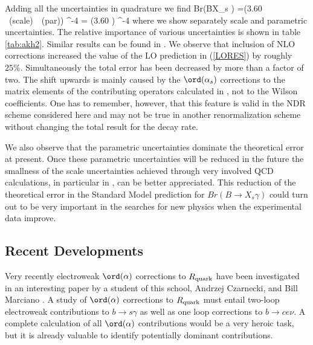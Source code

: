 Adding all the uncertainties 
in quadrature we find  
\be\label{sfin}
Br(B{\to}X_s \gamma) =(3.60 ~({\rm scale})~~({\rm par})) 
  ^{-4}
= (3.60 )  ^{-4}
\ee
where we show separately scale and parametric uncertainties.
The relative importance of various
uncertainties is shown in table \ref{tab:akh2}. Similar results
can be found in \cite{CZMM,BG98}. 
We observe that inclusion of NLO corrections
increased the value of the LO prediction in (\ref{LORES}) by 
roughly $25\%$. Simultaneously the total error has been decreased
by more than a factor of two. The shift upwards is mainly caused by the
$\ord(\alpha_s)$ corrections to the matrix elements of the
contributing operators calculated in \cite{GREUB}, 
not to the Wilson coefficients.
One has to remember, however, that this feature is valid in
the NDR scheme considered here and may not be true in another
renormalization scheme without changing the total result
for the decay rate.

We also observe that 
the parametric uncertainties dominate the theoretical
error at present. Once these parametric uncertainties will be reduced
in the future the smallness of the scale uncertainties achieved
through very involved QCD calculations, in particular in 
\cite{CZMM,GREUB,AG2,Pott,Yao1,GH97,BKP2}, can be better appreciated.
This reduction of the theoretical error in the Standard Model
prediction for $Br(B{\to}X_s \gamma)$ could turn out to be very
important in the searches for new physics when the experimental
data improve. 
\subsection{Recent Developments}
Very recently electroweak $\ord(\alpha)$ corrections to $R_{\rm quark}$
have been investigated in an interesting paper by a student of 
this school, Andrzej Czarnecki, and Bill Marciano \cite{CZMA}.
A study of $\ord(\alpha)$ corrections to $R_{\rm quark}$ must
entail two-loop electroweak contributions to $b \to s\gamma$
as well as one loop corrections to $b\to ce\nu$. A complete
calculation of all $\ord(\alpha)$ contributions would be a very
heroic task, but it is already valuable to identify potentially
dominant contributions.

